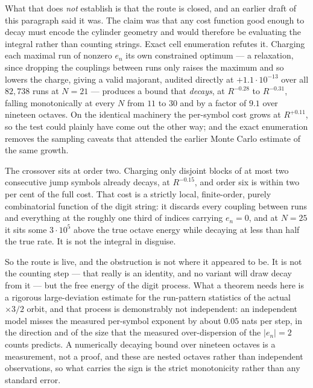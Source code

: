 \documentclass[11pt]{article}
\theoremstyle{remark}
\begin{document}
What that does \emph{not} establish is that the route is closed, and an earlier draft of this paragraph
said it was. The claim was that any cost function good enough to decay must encode the cylinder geometry
and would therefore be evaluating the integral rather than counting strings. Exact cell enumeration
refutes it. Charging each maximal run of nonzero $e_n$ its own constrained optimum --- a relaxation, since
dropping the couplings between runs only raises the maximum and so lowers the charge, giving a valid
majorant, audited directly at $+1.1\cdot10^{-13}$ over all $82{,}738$ runs at $N=21$ --- produces a bound
that \emph{decays}, at $R^{-0.28}$ to $R^{-0.31}$, falling monotonically at every $N$ from $11$ to $30$
and by a factor of $9.1$ over nineteen octaves. On the identical machinery the per-symbol cost grows at
$R^{+0.11}$, so the test could plainly have come out the other way; and the exact enumeration removes the
sampling caveats that attended the earlier Monte Carlo estimate of the same growth.

The crossover sits at order two. Charging only disjoint blocks of at most two consecutive jump symbols
already decays, at $R^{-0.15}$, and order six is within two per cent of the full cost. That cost is a
strictly local, finite-order, purely combinatorial function of the digit string: it discards every
coupling between runs and everything at the roughly one third of indices carrying $e_n=0$, and at $N=25$
it sits some $3\cdot10^5$ above the true octave energy while decaying at less than half the true rate.
It is not the integral in disguise.

So the route is live, and the obstruction is not where it appeared to be. It is not the counting step ---
that really is an identity, and no variant will draw decay from it --- but the free energy of the digit
process. What a theorem needs here is a rigorous large-deviation estimate for the run-pattern statistics
of the actual $\times3/2$ orbit, and that process is demonstrably not independent: an independent model
misses the measured per-symbol exponent by about $0.05$ nats per step, in the direction and of the size
that the measured over-dispersion of the $|e_n|=2$ counts predicts. A numerically decaying bound over
nineteen octaves is a measurement, not a proof, and these are nested octaves rather than independent
observations, so what carries the sign is the strict monotonicity rather than any standard error.
\end{document}
